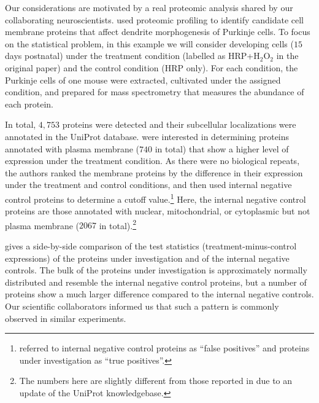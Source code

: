 \documentclass[a4paper,11pt]{article}
\theoremstyle{plain}
\theoremstyle{definition}
\theoremstyle{plain}
\begin{document}
Our considerations are motivated by a real proteomic analysis shared
by our collaborating neuroscientists. \textcite{shuster2022situ}
used proteomic profiling to identify
candidate cell membrane proteins that affect dendrite morphogenesis of
Purkinje cells.
To focus on the statistical problem, in this example we will consider
developing cells ($15$ days postnatal) under the treatment
condition (labelled as
HRP+H$_2$O$_2$ in the original paper) and the control condition (HRP
only). For each condition, the
Purkinje cells of one mouse were extracted, cultivated under the assigned
condition, and prepared for mass spectrometry that measures the abundance
of each protein.

In total, $4,753$ proteins were detected and their subcellular
localizations were annotated in the UniProt database.
\textcite{shuster2022situ} were interested in
determining proteins annotated with plasma membrane ($740$ in total)
that show a higher level of expression under the treatment
condition. As there were no biological repeats, the authors ranked the
membrane proteins by the difference in their expression under the
treatment and control conditions, and then used internal negative control
proteins to determine a cutoff
value.\footnote{\textcite{shuster2022situ} referred to internal negative
  control proteins as ``false positives'' and proteins under
  investigation as ``true positives''.} Here, the internal negative
control
proteins are those annotated with nuclear,
mitochondrial, or cytoplasmic but not plasma membrane ($2067$ in
total).\footnote{The
  numbers here are slightly different from
  those reported in \cite{shuster2022situ} due to an update of the
  UniProt knowledgebase.}

 gives a side-by-side
comparison of the test statistics (treatment-minus-control
expressions) of the proteins under investigation and of the internal negative
controls. The bulk of
the proteins under investigation is approximately normally distributed
and resemble the internal negative control
proteins, but a number of proteins show a much larger difference
compared to the internal negative controls. Our scientific collaborators
informed us that such a pattern is commonly observed in similar
experiments.
\end{document}
